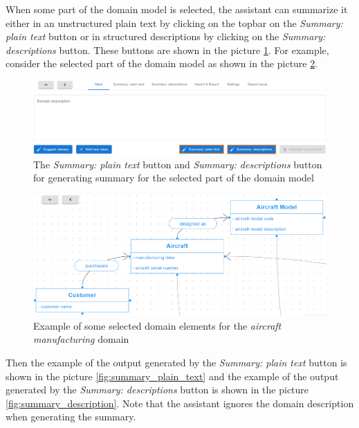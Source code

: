 When some part of the domain model is selected, the assistant can summarize it either in an unstructured plain text by clicking on the topbar on the \textit{Summary: plain text} button or in structured descriptions by clicking on the \textit{Summary: descriptions} button. These buttons are shown in the picture \ref{fig:summary_buttons}. For example, consider the selected part of the domain model as shown in the picture \ref{fig:selection_aircraft}.

\begin{figure}[!h]
    \includegraphics[scale=0.29]{../docs/images/frontend/summary-buttons.png}
    \caption{\centering The \textit{Summary: plain text} button and \textit{Summary: descriptions} button for generating summary for the selected part of the domain model}
    \label{fig:summary_buttons}
\end{figure}

\begin{figure}[!h]
    \includegraphics[scale=0.32]{../docs/images/frontend/selection-aircraft.png}
    \caption{\centering Example of some selected domain elements for the \textit{aircraft manufacturing} domain}
    \label{fig:selection_aircraft}
\end{figure}

Then the example of the output generated by the \textit{Summary: plain text} button is shown in the picture \ref{fig:summary_plain_text} and the example of the output generated by the \textit{Summary: descriptions} button is shown in the picture \ref{fig:summary_description}. Note that the assistant ignores the domain description when generating the summary.

